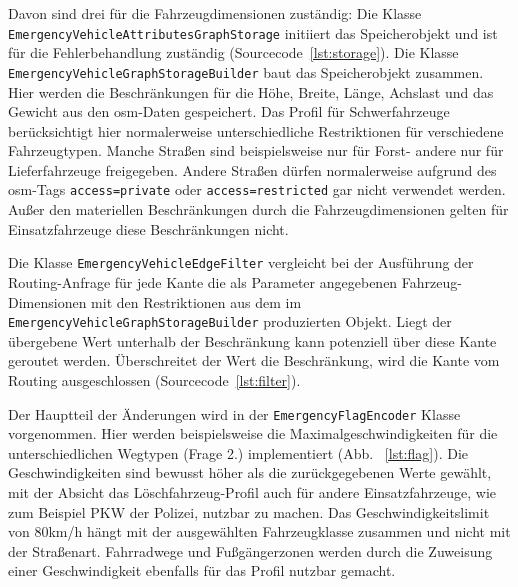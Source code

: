 Davon sind drei für die Fahrzeugdimensionen zuständig:
\newline
Die Klasse \texttt{EmergencyVehicleAttributesGraphStorage} initiiert das Speicherobjekt und ist für die Fehlerbehandlung zuständig (Sourcecode~\ref{lst:storage}).
\newline
Die Klasse \texttt{EmergencyVehicleGraphStorageBuilder} baut das Speicherobjekt zusammen.
Hier werden die Beschränkungen für die Höhe, Breite, Länge, Achslast und das Gewicht aus den \gls{osm}-Daten gespeichert.
Das Profil für Schwerfahrzeuge berücksichtigt hier normalerweise unterschiedliche Restriktionen für verschiedene Fahrzeugtypen.
Manche Straßen sind beispielsweise nur für Forst- andere nur für Lieferfahrzeuge freigegeben.
Andere Straßen dürfen normalerweise aufgrund des \gls{osm}-Tags \texttt{access=private} oder \texttt{access=restricted} gar nicht verwendet werden.
Außer den materiellen Beschränkungen durch die Fahrzeugdimensionen gelten für Einsatzfahrzeuge diese Beschränkungen nicht.

Die Klasse \texttt{EmergencyVehicleEdgeFilter} vergleicht bei der Ausführung der Routing-Anfrage für jede Kante die als Parameter angegebenen Fahrzeug-Dimensionen mit den Restriktionen aus dem im \texttt{EmergencyVehicleGraphStorageBuilder} produzierten Objekt.
Liegt der übergebene Wert unterhalb der Beschränkung kann potenziell über diese Kante geroutet werden.
Überschreitet der Wert die Beschränkung, wird die Kante vom Routing ausgeschlossen (Sourcecode~\ref{lst:filter}).


Der Hauptteil der Änderungen wird in der \texttt{EmergencyFlagEncoder} Klasse vorgenommen.
Hier werden beispielsweise die Maximalgeschwindigkeiten für die unterschiedlichen Wegtypen (Frage 2.) implementiert (Abb. ~\ref{lst:flag}).
Die Geschwindigkeiten sind bewusst höher als die zurückgegebenen Werte gewählt, mit der Absicht das Löschfahrzeug-Profil auch für andere Einsatzfahrzeuge, wie zum Beispiel PKW der Polizei, nutzbar zu machen.
Das Geschwindigkeitslimit von 80km/h hängt mit der ausgewählten Fahrzeugklasse zusammen und nicht mit der Straßenart.
Fahrradwege und Fußgängerzonen werden durch die Zuweisung einer Geschwindigkeit ebenfalls für das Profil nutzbar gemacht.

